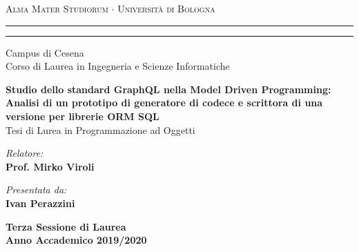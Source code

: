 
\begin{titlepage}
\begin{center}
{{\Large{\textsc{Alma Mater Studiorum $\cdot$ Universit\`a di
Bologna}}}} \rule[0.1cm]{15.8cm}{0.1mm}
\rule[0.5cm]{15.8cm}{0.6mm}
\large{Campus di Cesena\\
Corso di Laurea in Ingegneria e Scienze Informatiche}
\end{center}
\vspace{8mm}
\begin{center}
\LARGE\textbf{Studio dello standard GraphQL nella Model Driven Programming:\\\vspace{2.5mm}Analisi di un prototipo di generatore di codece e scrittora di una versione per librerie ORM SQL}\\
\vspace{8mm}
\large{Tesi di Lurea in Programmazione ad Oggetti}
\par
\end{center}
\vspace{40mm}
\noindent
\begin{minipage}[t]{0.47\textwidth}
\large{\emph{Relatore:}}\\
\large\textbf{Prof. Mirko Viroli}
\end{minipage}
\hfill
\begin{minipage}[t]{0.47\textwidth}\raggedleft
\large{\emph{Presentata da:}}\\
\large\textbf{Ivan Perazzini}
\end{minipage}
\vspace{20mm}
\begin{center}
{\large{\bf Terza Sessione di Laurea\\%
Anno Accademico 2019/2020}}%
\end{center}
\end{titlepage}